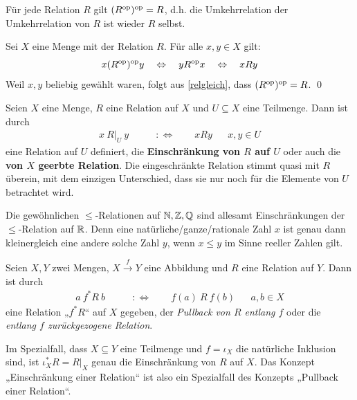 \begin{bem}[*]
    Für jede Relation $R$ gilt $(R^{\mathrm{op}})^{\mathrm{op}}=R$, d.h. die Umkehrrelation der Umkehrrelation von $R$ ist wieder $R$ selbst.
\end{bem}


\begin{bew}
    Sei $X$ eine Menge mit der Relation $R$. Für alle $x,y\in X$ gilt:
        \[ x(R^{\mathrm{op}})^{\mathrm{op}} y \quad\Leftrightarrow\quad yR^{\mathrm{op}} x \quad\Leftrightarrow\quad xRy  \]
    Weil $x,y$ beliebig gewählt waren, folgt aus \cref{relgleich}, dass $(R^{\mathrm{op}})^{\mathrm{op}} = R$. \qed
\end{bew}


\begin{de} 
    Seien $X$ eine Menge, $R$ eine Relation auf $X$ und $U\subseteq X$ eine Teilmenge. Dann ist durch
    \begin{align*}
        x\ R\vert_U\ y \qquad& :\Leftrightarrow\qquad xRy &&x,y\in U
    \end{align*}
    eine Relation auf $U$ definiert, die \textbf{Einschränkung von $R$ auf $U$} oder auch die \textbf{von $X$ geerbte Relation}. Die eingeschränkte Relation stimmt quasi mit $R$ überein, mit dem einzigen Unterschied, dass sie nur noch für die Elemente von $U$ betrachtet wird.
\end{de}


\begin{bsp}
    Die gewöhnlichen $\le$-Relationen auf $\mathbb N,\mathbb Z,\mathbb Q$ sind allesamt Einschränkungen der $\le$-Relation auf $\mathbb R$. Denn eine natürliche/ganze/rationale Zahl $x$ ist genau dann kleinergleich eine andere solche Zahl $y$, wenn $x\le y$ im Sinne reeller Zahlen gilt.
\end{bsp}


\begin{bem} \label{pullbackrel}
    Seien $X,Y$ zwei Mengen, $X\xrightarrow{f} Y$ eine Abbildung und $R$ eine Relation auf $Y$. Dann ist durch
    \begin{align*}
        a\ f^*R\ b \qquad& :\Leftrightarrow\qquad f(a)\ R\ f(b) &&a,b\in X
    \end{align*}
    eine Relation „$f^*R$“ auf $X$ gegeben, der \emph{Pullback von $R$ entlang $f$} oder die \emph{entlang $f$ zurückgezogene Relation}.

    Im Spezialfall, dass $X\subseteq Y$ eine Teilmenge und $f=\iota_X$ die natürliche Inklusion sind, ist $\iota_X^*R=R\vert_X$ genau die Einschränkung von $R$ auf $X$. Das Konzept „Einschränkung einer Relation“ ist also ein Spezialfall des Konzepts „Pullback einer Relation“.
\end{bem}


